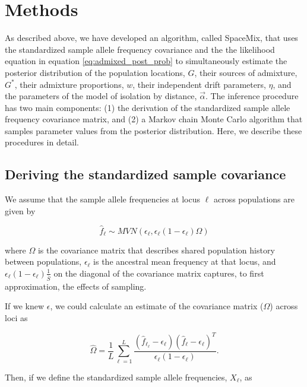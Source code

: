 \documentclass[12pt]{article}
\newcommand{\identifyadmixsource}[1]{{#1^{*}}}
\begin{document}
\section*{Methods}
As described above, we have developed an algorithm, called SpaceMix, that uses the standardized sample allele frequency covariance and the the likelihood equation in equation \eqref{eq:admixed_post_prob} to simultaneously estimate the posterior distribution of the population locations, $G$, their sources of admixture, $\identifyadmixsource{G}$, their admixture proportions, $w$, their independent drift parameters, $\eta$, and the parameters of the model of isolation by distance, $\vec{\alpha}$.  The inference procedure has two main components: (1) the derivation of the standardized sample allele frequency covariance matrix, and (2) a Markov chain Monte Carlo algorithm that samples parameter values from the posterior distribution.  Here, we describe these procedures in detail.

\subsection*{Deriving the standardized sample covariance}

We assume that the sample allele frequencies at locus $\ell$ across populations are given by

\begin{equation}
\hat{f}_{\ell} \sim MVN(\epsilon_{\ell}, \epsilon_{\ell} (1-\epsilon_{\ell})\Omega)
\end{equation}

where $\Omega$ is the covariance matrix that describes shared population history between populations, $\epsilon_{\ell}$ is the ancestral mean frequency at that locus, and $\epsilon_{\ell}(1 - \epsilon_{\ell})  \frac{1}{\bar{S}}$ on the diagonal of the covariance matrix captures, to first approximation, the effects of sampling.

If we knew $\epsilon$, we could calculate an estimate of the covariance matrix ($\Omega$) across loci as 

\begin{equation}
\label{eq:sample_cov}
\widehat{\Omega} = \frac{1}{L} \sum_{\ell=1}^{L} \frac{(\hat{f}_{\ell_{\ell}}  - \epsilon_{\ell}) (\hat{f}_{\ell}  - \epsilon_{\ell})^T}{\epsilon_{\ell}(1-\epsilon_{\ell})} \text{.}
\end{equation}

Then, if we define the standardized sample allele frequencies, $X_\ell$, as
\end{document}
